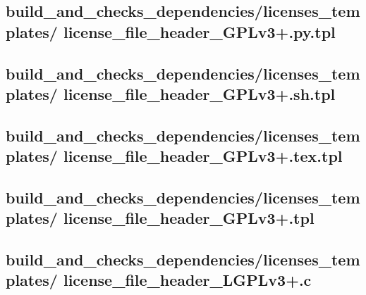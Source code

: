 \documentclass{article}
\begin{document}


\subsection{
  build\_and\_checks\_dependencies/licenses\_templates/%
license\_file\_header\_GPLv3+.py.tpl
}
\label{
  build_and_checks_dependencies:licenses_templates:%
license_file_header_GPLv3+pytpl
}



\subsection{
  build\_and\_checks\_dependencies/licenses\_templates/%
license\_file\_header\_GPLv3+.sh.tpl
}
\label{
  build_and_checks_dependencies:licenses_templates:%
license_file_header_GPLv3+shtpl
}



\subsection{
  build\_and\_checks\_dependencies/licenses\_templates/%
license\_file\_header\_GPLv3+.tex.tpl
}
\label{
  build_and_checks_dependencies:licenses_templates:%
license_file_header_GPLv3+textpl
}



\subsection{
  build\_and\_checks\_dependencies/licenses\_templates/%
license\_file\_header\_GPLv3+.tpl
}
\label{
  build_and_checks_dependencies:licenses_templates:%
license_file_header_GPLv3+tpl
}



\subsection{
  build\_and\_checks\_dependencies/licenses\_templates/%
license\_file\_header\_LGPLv3+.c
}
\label{
  build_and_checks_dependencies:licenses_templates:%
license_file_header_LGPLv3+c
}
\end{document}
